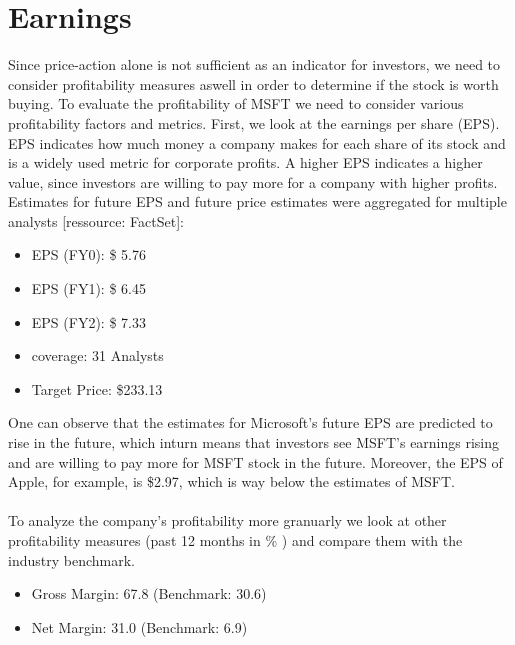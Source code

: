 \documentclass[]{article}
\begin{document}
	\section{Earnings}
	\noindent Since price-action alone is not sufficient as an indicator for investors, we need to consider profitability measures aswell in order to determine if the stock is worth buying. To evaluate the profitability of MSFT we need to consider various profitability factors and metrics. First, we look at the earnings per share (EPS). EPS indicates how much money a company makes for each share of its stock and is a widely used metric for corporate profits. A higher EPS indicates a higher value, since investors are willing to pay more for a company with higher profits.\cite{chen_2020}
	Estimates for future EPS and future price estimates were aggregated for multiple analysts [ressource: FactSet]:
	\begin{itemize}
		\item EPS (FY0): \$ 5.76
		\item EPS (FY1): \$ 6.45
		\item EPS (FY2): \$ 7.33
		\item coverage: 31 Analysts
		\item Target Price: \$233.13
	\end{itemize}
	One can observe that the estimates for Microsoft's future EPS are predicted to rise in the future, which inturn means that investors see MSFT's earnings rising and are willing to pay more for MSFT stock in the future. Moreover, the EPS of Apple, for example, is \$2.97, which is way below the estimates of MSFT.\\\\
	To analyze the company's profitability more granuarly we look at other profitability measures (past 12 months in \% ) and compare them with the industry benchmark.
	\begin{itemize}
		\item Gross Margin: 67.8 (Benchmark: 30.6)
		\item Net Margin: 31.0 (Benchmark: 6.9)
	\end{itemize}
	
\end{document}
